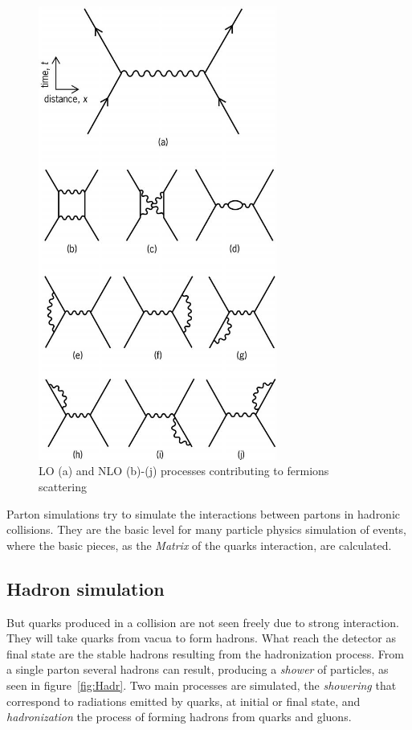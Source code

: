 \begin{figure}[!Hhtbp]
  \begin{center}
    \includegraphics[width=0.7\textwidth]{figs/Feynman_diagrams.jpg}
    \caption{LO (a) and NLO (b)-(j) processes contributing to fermions scattering}
    \label{fig:LOpNLO}
  \end{center}
\end{figure}

Parton simulations try to simulate the interactions between partons in hadronic collisions. They are the basic level for many particle physics simulation of events, where the basic pieces, as the \textit{Matrix} of the quarks interaction, are calculated.

\subsection{Hadron simulation}
\label{sec:hadron}

But quarks produced in a collision are not seen freely due to strong interaction. They will take quarks from vacua to form hadrons. What reach the detector as final state are the stable hadrons resulting from the hadronization process. From a single parton several hadrons can result, producing a \textit{shower} of particles, as seen in figure~\ref{fig:Hadr}. Two main processes are simulated, the \textit{showering} that correspond to radiations emitted by quarks, at initial or final state, and \textit{hadronization} the process of forming hadrons from quarks and gluons. 


